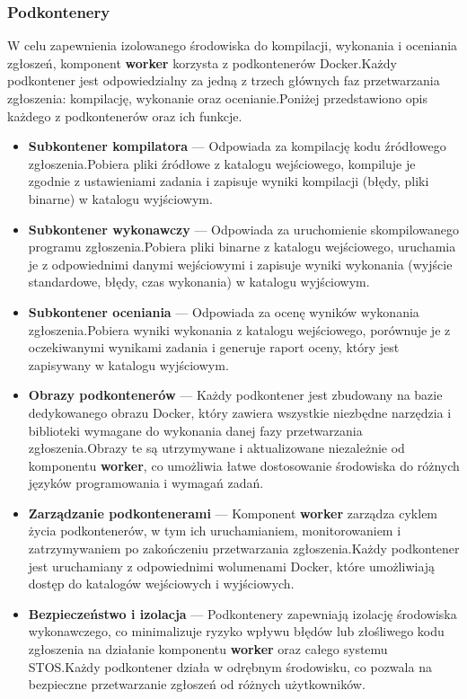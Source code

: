 \documentclass[12pt,a4paper]{article}
\begin{document}
\subsubsection{Podkontenery}

W celu zapewnienia izolowanego środowiska do kompilacji, wykonania i oceniania zgłoszeń, komponent \textbf{worker} korzysta z podkontenerów Docker.\@ Każdy podkontener jest odpowiedzialny za jedną z trzech głównych faz przetwarzania zgłoszenia: kompilację, wykonanie oraz ocenianie.\@ Poniżej przedstawiono opis każdego z podkontenerów oraz ich funkcje.
\begin{itemize}
    \item \textbf{Subkontener kompilatora} --- Odpowiada za kompilację kodu źródłowego zgłoszenia.\@ Pobiera pliki źródłowe z katalogu wejściowego, kompiluje je zgodnie z ustawieniami zadania i zapisuje wyniki kompilacji (błędy, pliki binarne) w katalogu wyjściowym.
    \item \textbf{Subkontener wykonawczy} --- Odpowiada za uruchomienie skompilowanego programu zgłoszenia.\@ Pobiera pliki binarne z katalogu wejściowego, uruchamia je z odpowiednimi danymi wejściowymi i zapisuje wyniki wykonania (wyjście standardowe, błędy, czas wykonania) w katalogu wyjściowym.
    \item \textbf{Subkontener oceniania} --- Odpowiada za ocenę wyników wykonania zgłoszenia.\@ Pobiera wyniki wykonania z katalogu wejściowego, porównuje je z oczekiwanymi wynikami zadania i generuje raport oceny, który jest zapisywany w katalogu wyjściowym.
    \item \textbf{Obrazy podkontenerów} --- Każdy podkontener jest zbudowany na bazie dedykowanego obrazu Docker, który zawiera wszystkie niezbędne narzędzia i biblioteki wymagane do wykonania danej fazy przetwarzania zgłoszenia.\@ Obrazy te są utrzymywane i aktualizowane niezależnie od komponentu \textbf{worker}, co umożliwia łatwe dostosowanie środowiska do różnych języków programowania i wymagań zadań.
    \item \textbf{Zarządzanie podkontenerami} --- Komponent \textbf{worker} zarządza cyklem życia podkontenerów, w tym ich uruchamianiem, monitorowaniem i zatrzymywaniem po zakończeniu przetwarzania zgłoszenia.\@ Każdy podkontener jest uruchamiany z odpowiednimi wolumenami Docker, które umożliwiają dostęp do katalogów wejściowych i wyjściowych.
    \item \textbf{Bezpieczeństwo i izolacja} --- Podkontenery zapewniają izolację środowiska wykonawczego, co minimalizuje ryzyko wpływu błędów lub złośliwego kodu zgłoszenia na działanie komponentu \textbf{worker} oraz całego systemu STOS.\@ Każdy podkontener działa w odrębnym środowisku, co pozwala na bezpieczne przetwarzanie zgłoszeń od różnych użytkowników.
\end{itemize}
\end{document}
